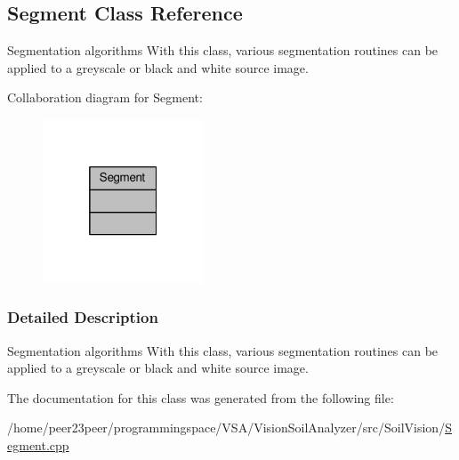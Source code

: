 \hypertarget{class_segment}{}\subsection{Segment Class Reference}
\label{class_segment}


Segmentation algorithms With this class, various segmentation routines can be applied to a greyscale or black and white source image.  




Collaboration diagram for Segment\+:
\nopagebreak
\begin{figure}[H]
\begin{center}
\leavevmode
\includegraphics[width=136pt]{class_segment__coll__graph}
\end{center}
\end{figure}


\subsubsection{Detailed Description}
Segmentation algorithms With this class, various segmentation routines can be applied to a greyscale or black and white source image. 

The documentation for this class was generated from the following file\+:\begin{DoxyCompactItemize}
\item 
/home/peer23peer/programmingspace/\+V\+S\+A/\+Vision\+Soil\+Analyzer/src/\+Soil\+Vision/\hyperlink{_segment_8cpp}{Segment.\+cpp}\end{DoxyCompactItemize}
